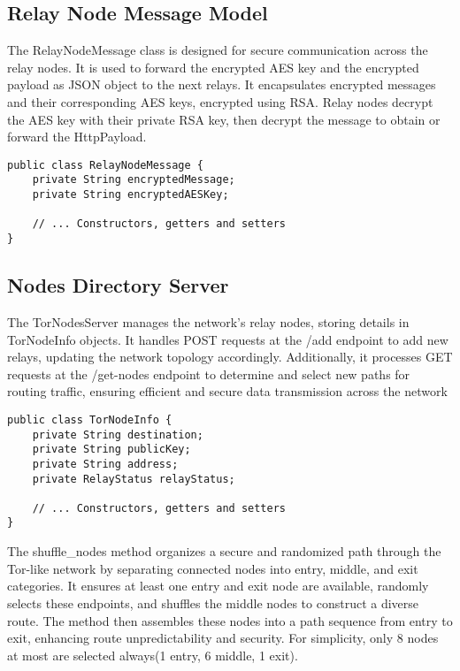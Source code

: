 \documentclass[sigconf]{acmart}
\begin{document}
\subsection{Relay Node Message Model}
The RelayNodeMessage class is designed for secure communication across the relay nodes. It is used to forward the encrypted AES key and the encrypted payload as JSON object to the next relays. It encapsulates encrypted messages and their corresponding AES keys, encrypted using RSA. Relay nodes decrypt the AES key with their private RSA key, then decrypt the message to obtain or forward the HttpPayload.
\begin{lstlisting}
public class RelayNodeMessage {
    private String encryptedMessage;
    private String encryptedAESKey;

    // ... Constructors, getters and setters
}
\end{lstlisting}


\subsection{Nodes Directory Server}
The TorNodesServer manages the network’s relay nodes, storing details in TorNodeInfo objects. It handles POST requests at the /add endpoint to add new relays, updating the network topology accordingly. Additionally, it processes GET requests at the /get-nodes endpoint to determine and select new paths for routing traffic, ensuring efficient and secure data transmission across the network

\begin{lstlisting}
public class TorNodeInfo {
    private String destination;
    private String publicKey;
    private String address;
    private RelayStatus relayStatus;

    // ... Constructors, getters and setters
}
\end{lstlisting}

The shuffle\_nodes method organizes a secure and randomized path through the Tor-like network by separating connected nodes into entry, middle, and exit categories. It ensures at least one entry and exit node are available, randomly selects these endpoints, and shuffles the middle nodes to construct a diverse route. The method then assembles these nodes into a path sequence from entry to exit, enhancing route unpredictability and security. For simplicity, only 8 nodes at most are selected always(1 entry, 6 middle, 1 exit).
\end{document}
